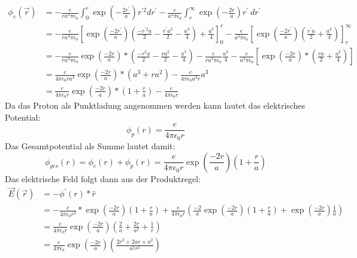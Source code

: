 \documentclass{article}
\newcommand{\epsz}{\epsilon_0}
\begin{document}
\begin{align*}
	\phi_e\left( \vec r \right)
	&= - \frac{e}{r a^3 \pi\epsz}
	\int_0^r
	\exp\left(-\frac{2r^\prime}{a} \right)
	r^{\prime 2}
	dr^\prime
	- \frac e {a^3 \pi\epsz}
	\int_r^\infty
	\exp\left(-\frac{2r}{a} \right)
	r^\prime \
	dr^\prime
	\\
	&= - \frac{e}{r a^3 \pi\epsz}
	\left[
		\exp\left(\frac{-2r^\prime}{a}\right)
		\left( \frac{-r^{\prime 2}a}{2} - \frac{r^\prime a^2}{2} - 
		\frac{a^3}{4}
		\right)
		+\frac{a^3}{4}
	\right]_0^r 
	- \frac e {a^3 \pi\epsz}
	\left[
		\exp\left(\frac{-2r^\prime}{a}\right)
		\left( \frac{r^\prime a}{2} + \frac{a^2}{4} \right)
	\right]_r^\infty
	\\
	&= - \frac{e}{r a^3 \pi\epsz}
		\exp\left( \frac{-2r}{a} \right) *
		\left(
		\frac{-r^2a}{2} - \frac{ra^2}{2} - \frac{a^3}{4}
		\right)
	- \frac{e}{r a^3 \pi\epsz}
		\frac{a^3}{4}
	- \frac{e}{a^3 \pi \epsz}
	\left[
		\exp\left( \frac{-2r}{a} \right) * 
		\left(
		\frac{ra}{2} + \frac{a^2}{4}
		\right)
	\right] \\
	&= \frac{e}{4\pi\epsz r a^3} \exp\left( \frac{-2r}{a} \right) *
	\left( a^3 + ra^2 \right) - \frac{e}{4\pi\epsz a^3 r} a^3 \\
	&= \frac{e}{4\pi\epsz r} \exp\left(\frac{-2r}{a}\right) *
	\left( 1 + \frac{r}{a} \right) - \frac{e}{4\pi\epsz r}
\end{align*}
Da das Proton als Punktladung angenommen werden kann lautet das elektrisches Potential:
\[
	\phi_p (r) = \frac{e}{4\pi\epsz r}
	\]
Das Gesamtpotential als Summe lautet damit:
\[
	\phi_{ges} (r) = \phi_e (r) + \phi_p (r) =
	\frac{e}{4\pi\epsz r} \exp\left( \frac{-2r}{a}\right)
	\left( 1 + \frac r a \right)
\]
\newpage
Das elektrische Feld folgt dann aus der Produktregel:
\begin{align*}
	\vec E (\vec r) 
	&= -\phi^\prime(r) * \hat r \\
	&= -\frac{e}{4\pi\epsz r^2} * \exp\left(\frac{-2r}{a}\right)
	\left(1 + \frac ra \right)
	+ \frac{e}{4\pi\epsz r} \left(
	\frac{-2}{a} \exp\left(\frac{-2r}{a}\right) \left(1+\frac ra \right)
	+ \exp\left(\frac{-2r}{a}\right) \frac1a
	\right) \\
	&= \frac{e}{4\pi\epsz r} \exp\left(\frac{-2r}{a}\right)
	\left( \frac2a + \frac{2r}{a^2} + \frac1r \right) \\
	&= \frac{e}{4\pi\epsz} \exp\left(\frac{-2r}{a}\right)
	\left( \frac{2r^2 + 2ar + a^2}{a^2r^2} \right)
\end{align*}
\end{document}
